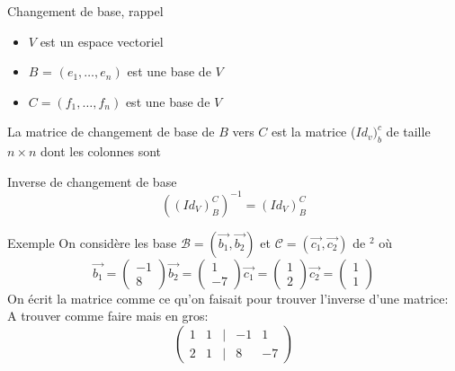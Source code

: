 \begin{parag}{Changement de base, rappel}
    \begin{itemize}
        \item $V$ est un espace vectoriel
        \item $B$  = $(e_1, \dots, e_n)$ est une base de $V$
        \item $C = (f_1, \dots, f_n)$ est une base de $V$
    \end{itemize}

\begin{definition}
    La matrice de changement de base de $B$ vers $C$ est la matrice ($Id_v)_b^c$ de taille $n \times n$ dont les colonnes sont 
\end{definition}
\begin{subparag}{Inverse de changement de base}
   \[ \left((Id_V)_B^C\right)^{-1} = (Id_V)_B^C \]
\end{subparag}
\begin{subparag}{Exemple}
    On considère les base $\mathcal{B} = (\vec{b_1}, \vec{b_2})$ et $\mathcal{C} = ( \vec{c_1}, \vec{c_2})$ de \R$^2$ où
    \[\vec{b_1} = \begin{pmatrix}
        -1 \\ 8
    \end{pmatrix} \vec{b_2} = \begin{pmatrix}
        1 \\-7
    \end{pmatrix} \vec{c_1} = \begin{pmatrix}
        1 \\ 2
    \end{pmatrix} \vec{c_2} = \begin{pmatrix}
        1 \\ 1
    \end{pmatrix}\]
    On écrit la matrice comme ce qu'on faisait pour trouver l'inverse d'une matrice: 
    A trouver comme faire mais en gros:
\[\begin{pmatrix}
    1 & 1 & | & -1 & 1 \\
    2 & 1 & | & 8 & -7
\end{pmatrix}\]
\end{subparag}
\end{parag}

